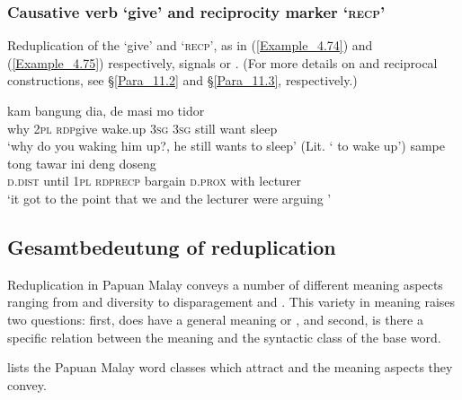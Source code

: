 {\subsubsection[Causative \isi{verb} kasi ‘give’ and {reciprocity marker} baku ‘recp’]{Causative {verb}  ‘give’ and {reciprocity marker}  ‘\textsc{recp}’}
\label{Para_4.2.5.4}
Reduplication of the    ‘give’ and   ‘\textsc{recp}’, as in (\ref{Example_4.74}) and (\ref{Example_4.75}) respectively, signals  or . (For more details on  and reciprocal constructions, see §\ref{Para_11.2} and §\ref{Para_11.3}, respectively.)


\ea
\label{Example_4.74}
 {kam} {} {bangung} {dia}, {de} {masi} {mo} {tidor}\\ %
 why  \textsc{2pl}  \textsc{rdp}{\Tilde}give  wake.up  \textsc{3sg}  \textsc{3sg}  still  want  sleep\\
\glt 
‘why do you waking him up?, he still wants to sleep’ (Lit. ‘ to wake up’) \textstyleExampleSource{[080918-001-CvNP.0039]}
\z
\ea
\label{Example_4.75}
 {sampe} {tong} {} {tawar} {ini} {deng} {doseng}\\ %
 \textsc{d.dist}  until  \textsc{1pl}  \textsc{rdp}{\Tilde}\textsc{recp}  bargain  \textsc{d.prox}  with  lecturer\\
\glt
‘it got to the point that we and the lecturer were arguing ’ \textstyleExampleSource{[080917-010-CvEx.0177]}
\z


\subsection{Gesamtbedeutung of reduplication}
\label{Para_4.2.6}
Reduplication in Papuan Malay conveys a number of different meaning aspects ranging from  and diversity to disparagement and . This variety in meaning raises two questions: first, does  have a general meaning or , and second, is there a specific relation between the meaning and the syntactic class of the base word.



 lists the Papuan Malay word classes which attract  and the meaning aspects they convey.


}
